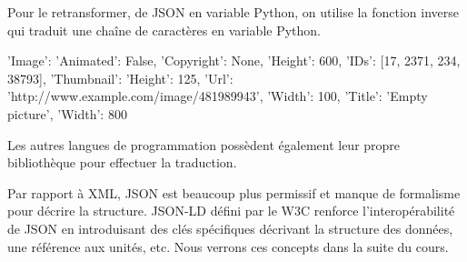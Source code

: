 Pour le retransformer, de JSON en variable Python, on utilise la fonction inverse  qui traduit une chaîne de caractères en variable Python.

\begin{termc}[backgroundcolor=\color{gray!10}, language=json, basicstyle=\tiny]
{'Image': {'Animated': False,
           'Copyright': None,
           'Height': 600,
           'IDs': [17, 2371, 234, 38793],
           'Thumbnail': {'Height': 125,
                         'Url': 'http://www.example.com/image/481989943',
                         'Width': 100},
           'Title': 'Empty picture',
           'Width': 800}}
\end{termc}


Les autres langues de programmation possèdent également leur propre bibliothèque pour effectuer la traduction.

     \vspace{1em}

Par rapport à \ac{XML}, \ac{JSON} est beaucoup plus permissif et manque de formalisme pour décrire la structure. \ac{JSON-LD} défini par le \ac{W3C} renforce l’interopérabilité de JSON en introduisant des clés spécifiques décrivant la structure des données, une référence aux unités, etc. Nous verrons ces concepts dans la suite du cours.

